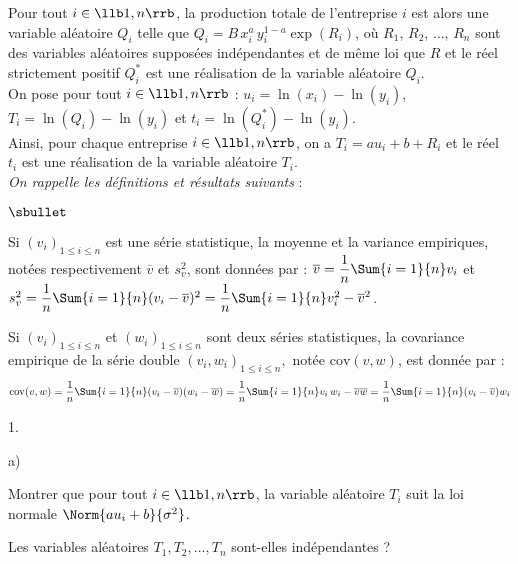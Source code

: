 \documentclass[11pt]{article}%
\begin{document}
\noindent
Pour tout $i \in \llb 1,n \rrb$, la production totale de l'entreprise 
$i$ est alors une variable aléatoire $Q_i$ telle que 
$Q_i=B \, x_i^a \, y_i^{1-a} \exp(R_i)$, où $R_1$, $R_2$, 
$\ldots$, $R_n$ sont des variables aléatoires supposées indépendantes 
et de même loi que $R$ et le réel strictement positif $Q_i^*$ est une 
réalisation de la variable aléatoire $Q_i.$\\
On pose pour tout $i \in \llb 1,n \rrb$ : $u_i=\ln(x_i) - \ln(y_i)$, 
$T_i=\ln(Q_i) - \ln(y_i)$ et $t_i=\ln(Q_i^*)-\ln(y_i)$.\\
Ainsi, pour chaque entreprise $i \in \llb 1,n \rrb$, on a 
$T_i=au_i+b+R_i$ et le réel $t_i$ est une réalisation de la variable 
aléatoire $T_i$.\\
{\it On rappelle les définitions et résultats suivants} :
\begin{noliste}{$\sbullet$}
 \item Si $(v_i)_{1 \leq i \leq n}$ est une série statistique, la 
 moyenne et la variance empiriques, notées respectivement 
 $\overline{v}$ et $s_v^2$, sont données par :
 $\overline{v}=\dfrac{1}{n}\Sum{i=1}{n} v_i$ et 
 $s_v^2=\dfrac{1}{n}\Sum{i=1}{n} (v_i-\overline{v})^2 = 
 \dfrac{1}{n}\Sum{i=1}{n} v_i^2-\overline{v}^2$.\\
 
 \item Si $(v_i)_{1 \leq i \leq n}$ et $(w_i)_{1 \leq i \leq n}$ sont 
 deux séries statistiques, la covariance empirique de la série double 
 $(v_i,w_i)_{1 \leq i \leq n},$ notée $\mathrm{cov}(v,w)$, est donnée 
 par :  
 \[
 \mathrm{cov}(v,w)=\dfrac{1}{n}\Sum{i=1}{n}(v_i - 
 \overline{v})(w_i-\overline{w}) = \dfrac{1}{n}\Sum{i=1}{n} v_i \, w_i 
 - \overline{v}\overline{w} = \dfrac{1}{n}\Sum{i=1}{n} 
 (v_i-\overline{v})w_i
 \]
\end{noliste}


\begin{noliste}{1.}
 \setlength{\itemsep}{4mm}
 \setcounter{enumi}{8}
 \item 
 \begin{noliste}{a)}
  \setlength{\itemsep}{2mm}
  \item Montrer que pour tout $i \in \llb 1,n \rrb$, la variable 
  aléatoire $T_i$ suit la loi normale $\Norm{au_i+b}{\sigma^2}$.
  
  

  
  \item Les variables aléatoires $T_1,T_2,...,T_n$ sont-elles 
  indépendantes ?
  
  
 \end{noliste}
\end{noliste}
\end{document}
